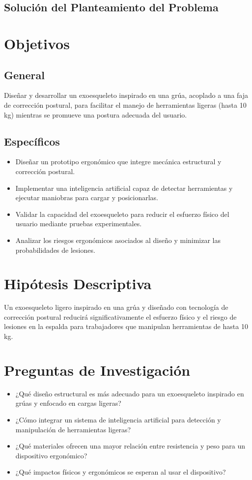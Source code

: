 \subsection{Solución del Planteamiento del Problema} %

\section{Objetivos}
\subsection{General}
Diseñar y desarrollar un exoesqueleto inspirado en una grúa, acoplado a una faja de corrección postural, para facilitar el manejo de herramientas ligeras (hasta 10 kg) mientras se promueve una postura adecuada del usuario.

\subsection{Específicos}
\begin{itemize}
    \item Diseñar un prototipo ergonómico que integre mecánica estructural y corrección postural.
    \item Implementar una inteligencia artificial capaz de detectar herramientas y ejecutar maniobras para cargar y posicionarlas.
    \item Validar la capacidad del exoesqueleto para reducir el esfuerzo físico del usuario mediante pruebas experimentales.
    \item Analizar los riesgos ergonómicos asociados al diseño y minimizar las probabilidades de lesiones.
\end{itemize}

\section{Hipótesis Descriptiva}
Un exoesqueleto ligero inspirado en una grúa y diseñado con tecnología de corrección postural reducirá significativamente el esfuerzo físico y el riesgo de lesiones en la espalda para trabajadores que manipulan herramientas de hasta 10 kg.


\section{Preguntas de Investigación}
\begin{itemize}
    \item ¿Qué diseño estructural es más adecuado para un exoesqueleto inspirado en grúas y enfocado en cargas ligeras?
    \item ¿Cómo integrar un sistema de inteligencia artificial para detección y manipulación de herramientas ligeras?
    \item ¿Qué materiales ofrecen una mayor relación entre resistencia y peso para un dispositivo ergonómico?
    \item ¿Qué impactos físicos y ergonómicos se esperan al usar el dispositivo?
\end{itemize}


